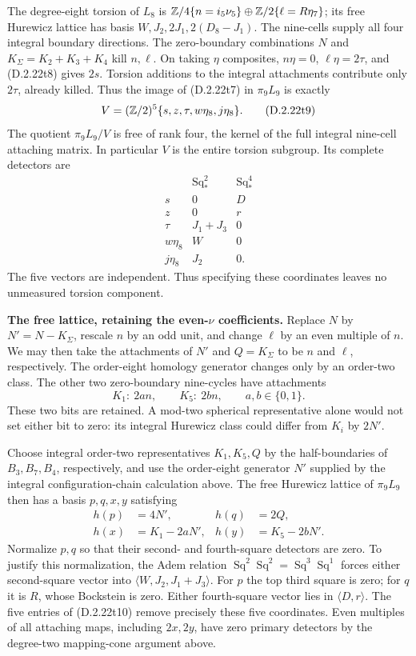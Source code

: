 The degree-eight torsion of $L_8$ is
$\mathbb Z/4\{n=i_5\nu_5\}\oplus\mathbb Z/2\{\ell=R\eta_7\}$;
its free Hurewicz lattice has basis
$W,J_2,2J_1,2(D_8-J_1)$.
The nine-cells supply all four integral boundary directions.
The zero-boundary combinations $N$ and
$K_\Sigma=K_2+K_3+K_4$ kill $n,\ell$.
On taking $\eta$ composites, $n\eta=0$,
$\ell\eta=2\tau$, and \textup{(D.2.22t8)} gives $2s$.
Torsion additions to the integral attachments contribute only
$2\tau$, already killed.  Thus the image of
\textup{(D.2.22t7)} in $\pi_9L_9$ is exactly
\[
 V=(\mathbb Z/2)^5\{s,z,\tau,w\eta_8,j\eta_8\}.
 \tag{D.2.22t9}
\]
The quotient $\pi_9L_9/V$ is free of rank four, the kernel
of the full integral nine-cell attaching matrix.  In particular
$V$ is the entire torsion subgroup.  Its complete detectors are
\[
\begin{array}{c|c|c}
 &\operatorname{Sq}_*^2&\operatorname{Sq}_*^4\\ \hline
 s&0&D\\
 z&0&r\\
 \tau&J_1+J_3&0\\
 w\eta_8&W&0\\
 j\eta_8&J_2&0.
\end{array}
 \tag{D.2.22t10}
\]
The five vectors are independent.  Thus specifying these
coordinates leaves no unmeasured torsion component.

\medskip\noindent
\textbf{The free lattice, retaining the even-$\nu$ coefficients.}
Replace $N$ by $N'=N-K_\Sigma$, rescale $n$ by an odd
unit, and change $\ell$ by an even multiple of $n$.
We may then take the attachments of $N'$ and
$Q=K_\Sigma$ to be $n$ and $\ell$, respectively.
The order-eight homology generator changes only by an
order-two class.  The other two zero-boundary nine-cycles
have attachments
\[
 K_1:\ 2a n,
       \qquad K_5:\ 2b n,
       \qquad a,b\in\{0,1\}.
 \tag{D.2.22t11}
\]
These two bits are retained.  A mod-two spherical representative
alone would not set either bit to zero: its integral Hurewicz
class could differ from $K_i$ by $2N'$.

Choose integral order-two representatives $K_1,K_5,Q$ by
the half-boundaries of $B_3,B_7,B_4$, respectively, and use
the order-eight generator $N'$ supplied by the integral
configuration-chain calculation above.
The free Hurewicz lattice of $\pi_9L_9$ then has a basis
$p,q,x,y$ satisfying
\[
 \begin{aligned}
 h(p)&=4N',& h(q)&=2Q,\\
 h(x)&=K_1-2aN',&h(y)&=K_5-2bN'.
 \end{aligned}
 \tag{D.2.22t12}
\]
Normalize $p,q$ so that their second- and fourth-square
detectors are zero.  To justify this normalization, the Adem
relation $\operatorname{Sq}^2\operatorname{Sq}^2
=\operatorname{Sq}^3\operatorname{Sq}^1$ forces either
second-square vector into
$\langle W,J_2,J_1+J_3\rangle$.
For $p$ the top third square is zero; for $q$ it is $R$,
whose Bockstein is zero.  Either fourth-square vector lies
in $\langle D,r\rangle$.
The five entries of \textup{(D.2.22t10)} remove precisely
these five coordinates.  Even multiples of all attaching maps,
including $2x,2y$, have zero primary detectors by the
degree-two mapping-cone argument above.

